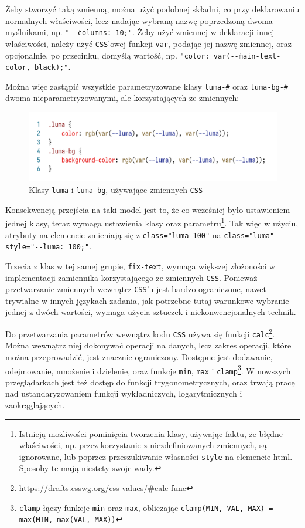 \documentclass[licencjacka]{pracadypl}
\begin{document}
Żeby stworzyć taką zmienną, można użyć podobnej składni, co przy deklarowaniu normalnych właściwości, lecz nadając wybraną nazwę poprzedzoną dwoma myślnikami, np. \texttt{"-\.-columns: 10;"}. Żeby użyć zmiennej w deklaracji innej właściwości, należy użyć \texttt{CSS}'owej funkcji \texttt{var}, podając jej nazwę zmiennej, oraz opcjonalnie, po przecinku, domyślą wartość, np. \texttt{"color: var(-\.-main-text-color, black);"}.

Można więc zastąpić wszystkie parametryzowane klasy \texttt{luma-\#} oraz \texttt{luma-bg-\#} dwoma nieparametryzowanymi, ale korzystających ze zmiennych:

\begin{figure}[H]
  \centering
  \includegraphics[width=\linewidth/\real{1.35}]{images/code-css-luma-vars.png}
  \caption{Klasy \texttt{luma} i \texttt{luma-bg}, używające zmiennych \texttt{CSS}}
  \label{fig:css-css-luma-vars}
\end{figure}

Konsekwencją przejścia na taki model jest to, że co wcześniej było ustawieniem jednej klasy, teraz wymaga ustawienia klasy oraz parametru\footnote{Istnieją możliwości pominięcia tworzenia klasy, używając faktu, że błędne właściwości, np. przez korzystanie z niezdefiniowanych zmiennych, są ignorowane, lub poprzez przeszukiwanie własności \texttt{style} na elemencie html. Sposoby te mają niestety swoje wady.}. Tak więc w użyciu, atrybuty na elemencie zmieniają się z \texttt{class="luma-100"} na \texttt{class="luma" style="-\.-luma: 100;"}.

Trzecia z klas w tej samej grupie, \texttt{fix-text}, wymaga większej złożoności w implementacji zamiennika korzystającego ze zmiennych \texttt{CSS}. Ponieważ przetwarzanie zmiennych wewnątrz \texttt{CSS}'u jest bardzo ograniczone, nawet trywialne w innych językach zadania, jak potrzebne tutaj warunkowe wybranie jednej z dwóch wartości, wymaga użycia sztuczek \linebreak i niekonwencjonalnych technik.

Do przetwarzania parametrów wewnątrz kodu \texttt{CSS} używa się funkcji \texttt{calc}\footnote{\url{https://drafts.csswg.org/css-values/\#calc-func}}. Można wewnątrz niej dokonywać operacji na danych, lecz zakres operacji, które można przeprowadzić, jest znacznie ograniczony. Dostępne jest dodawanie, odejmowanie, mnożenie i dzielenie, oraz funkcje \texttt{min}, \texttt{max} i \texttt{clamp}\footnote{\texttt{clamp} łączy funkcje \texttt{min} oraz \texttt{max}, obliczając \texttt{clamp(MIN, VAL, MAX) = max(MIN, max(VAL, MAX))}}. W nowszych przeglądarkach jest też dostęp do funkcji trygonometrycznych, oraz trwają pracę nad ustandaryzowaniem funkcji wykładniczych, logarytmicznych i zaokrąglających.
\end{document}
